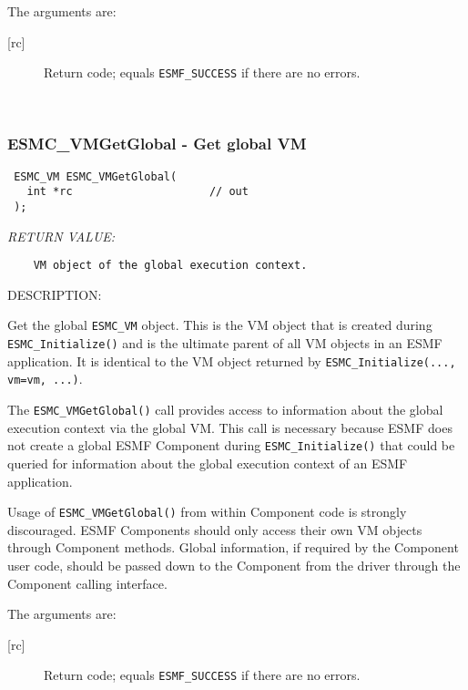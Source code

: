     The arguments are:
    \begin{description}
    \item[{[rc]}]
      Return code; equals {\tt ESMF\_SUCCESS} if there are no errors.
    \end{description}
   
 
\mbox{}\hrulefill\ 
 
\subsubsection [ESMC\_VMGetGlobal] {ESMC\_VMGetGlobal - Get global VM}


  
\begin{verbatim} ESMC_VM ESMC_VMGetGlobal(
   int *rc                     // out
 );\end{verbatim}{\em RETURN VALUE:}
\begin{verbatim}    VM object of the global execution context.\end{verbatim}
{\sf DESCRIPTION:\\ }


  
    Get the global {\tt ESMC\_VM} object. This is the VM object
    that is created during {\tt ESMC\_Initialize()} and is the ultimate
    parent of all VM objects in an ESMF application. It is identical to the VM
    object returned by {\tt ESMC\_Initialize(..., vm=vm, ...)}.
  
    The {\tt ESMC\_VMGetGlobal()} call provides access to information about the
    global execution context via the global VM. This call is necessary because
    ESMF does not create a global ESMF Component during
    {\tt ESMC\_Initialize()} that could be queried for information about
    the global execution context of an ESMF application.
    
    Usage of {\tt ESMC\_VMGetGlobal()} from within Component code is
    strongly discouraged. ESMF Components should only access their own VM
    objects through Component methods. Global information, if required by
    the Component user code, should be passed down to the Component from the 
    driver through the Component calling interface.
    \newline
  
    The arguments are:
    \begin{description}
    \item[{[rc]}]
      Return code; equals {\tt ESMF\_SUCCESS} if there are no errors.
    \end{description}
   
